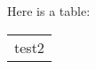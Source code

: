 \documentclass{article}
\begin{document}
Here is a table:

\begin{tabular}{p{5.2pt}}
test2
\end{tabular}
\end{document}
